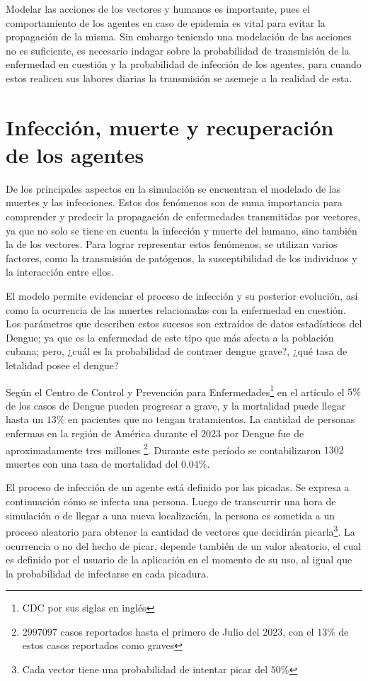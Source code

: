 Modelar las acciones de los vectores y humanos es importante, pues el comportamiento de los 
agentes en caso de epidemia es vital para evitar la propagación de la misma. Sin embargo teniendo una modelación
de las acciones no es suficiente, es necesario indagar sobre la probabilidad de transmisión de la enfermedad en 
cuestión y la probabilidad de infección de los agentes, para cuando estos realicen sus labores diarias
la transmisión se asemeje a la realidad de esta.

\section{Infección, muerte y recuperación de los agentes}
De los principales aspectos en la simulación se encuentran el modelado de las muertes y las infecciones.
Estos dos fenómenos son de suma importancia para comprender y predecir la propagación de enfermedades 
transmitidas por vectores, ya que no solo se tiene en cuenta la infección y muerte del humano, sino también
la de los vectores. Para lograr representar estos fenómenos, se utilizan varios
factores, como la transmisión de patógenos, la susceptibilidad de los individuos y la interacción entre ellos.

El modelo permite evidenciar el proceso de infección y su posterior evolución, así como la ocurrencia de 
las muertes relacionadas con la enfermedad en cuestión. Los parámetros que describen estos sucesos son 
extraídos de datos estadísticos del Dengue; ya que es la enfermedad de este tipo que más afecta a la población 
cubana; pero, ¿cuál es la probabilidad de contraer dengue grave?, ¿qué tasa de letalidad posee el dengue?

Según el Centro de Control y Prevención para Enfermedades\footnote{CDC por sus siglas en inglés} en el artículo 
\autocite{CDC2022} el $5\%$ de los casos de Dengue pueden progresar a grave, y la mortalidad puede llegar
hasta un $13\%$ en pacientes que no tengan tratamientos. La cantidad de personas enfermas en la región de América
durante el $2023$ por Dengue fue de aproximadamente tres millones \footnote{$2997097$ casos reportados hasta el primero
de Julio del $2023$, con el $13\%$ de estos casos reportados como graves}\autocite{WHO2023S}. Durante este 
período se contabilizaron $1302$ muertes con una tasa de mortalidad del $0.04\%$.

El proceso de infección de un agente está definido por las picadas. Se expresa a continuación
cómo se infecta una persona. Luego de transcurrir una hora de simulación
o de llegar a una nueva localización, la persona es sometida a un proceso aleatorio para obtener la 
cantidad de vectores que decidirán picarla\footnote{Cada vector tiene una probabilidad de intentar 
picar del $50\%$}. La ocurrencia o no del hecho de picar, depende también de un valor aleatorio, el cual es 
definido por el usuario de la aplicación en el momento de su uso, al igual que la probabilidad de infectarse
en cada picadura.

